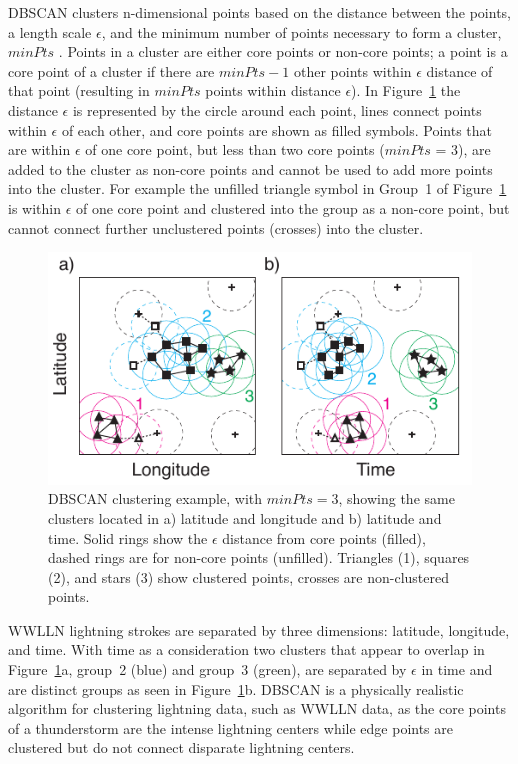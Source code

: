 DBSCAN clusters n-dimensional points based on the distance between the points, a length scale $\epsilon$, and the minimum number of points necessary to form a cluster, $minPts$ \citep{Kriegel2011a}.
Points in a cluster are either core points or non-core points; a point is a core point of a cluster if there are $minPts - 1$ other points within $\epsilon$ distance of that point (resulting in $minPts$ points within distance $\epsilon$).
In Figure~\ref{gec:fig:dbscan} the distance $\epsilon$ is represented by the circle around each point, lines connect points within $\epsilon$ of each other, and core points are shown as filled symbols.
Points that are within $\epsilon$ of one core point, but less than two core points ($minPts$ = 3), are added to the cluster as non-core points and cannot be used to add more points into the cluster.
For example the unfilled triangle symbol in Group~1 of Figure~\ref{gec:fig:dbscan} is within $\epsilon$ of one core point and clustered into the group as a non-core point, but cannot connect further unclustered points (crosses) into the cluster.

 \begin{figure}[ht!]
    \centering
    \includegraphics[scale=1]{GEC/Figures/dbscan.pdf}
    \caption{DBSCAN clustering example, with $minPts = 3$, showing the same clusters located in a) latitude and longitude and b) latitude and time.
    		 Solid rings show the $\epsilon$ distance from core points (filled), dashed rings are for non-core points (unfilled).
		 Triangles (1), squares (2), and stars (3) show clustered points, crosses are non-clustered points.}
    \label{gec:fig:dbscan}
 \end{figure}

WWLLN lightning strokes are separated by three dimensions: latitude, longitude, and time.
With time as a consideration two clusters that appear to overlap in Figure~\ref{gec:fig:dbscan}a, group~2 (blue) and group~3 (green), are separated by $\epsilon$ in time and are distinct groups as seen in Figure~\ref{gec:fig:dbscan}b.
DBSCAN is a physically realistic algorithm for clustering lightning data, such as WWLLN data, as the core points of a thunderstorm are the intense lightning centers while edge points are clustered but do not connect disparate lightning centers.

